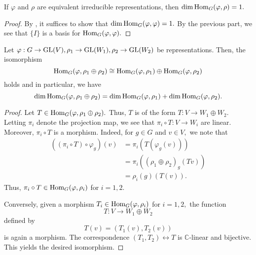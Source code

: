 \begin{cor} \label{cor:schurdimone}
	If $\varphi$ and $\rho$ are equivalent irreducible representations, then $\dim \operatorname{Hom}_{G}(\varphi, \rho) = 1.$
\end{cor}
\begin{proof} 
	By , it suffices to show that $\dim \operatorname{Hom}_{G}(\varphi, \varphi) = 1.$ By the previous part, we see that $\{I\}$ is a basis for $\operatorname{Hom}_{G}(\varphi, \varphi).$
\end{proof}

\begin{prop} \label{prop:homoplusiso}
	Let $\varphi : G \to \operatorname{GL}(V), \rho_1 \to \operatorname{GL}(W_1), \rho_2 \to \operatorname{GL}(W_2)$ be representations. Then, the isomorphism
	\begin{equation*} 
		\operatorname{Hom}_{G}(\varphi, \rho_1 \oplus \rho_2) \cong \operatorname{Hom}_{G}(\varphi, \rho_1) \oplus \operatorname{Hom}_{G}(\varphi, \rho_2)
	\end{equation*}
	holds and in particular, we have
	\begin{equation*} 
		\dim\operatorname{Hom}_{G}(\varphi, \rho_1 \oplus \rho_2) = \dim\operatorname{Hom}_{G}(\varphi, \rho_1) + \dim\operatorname{Hom}_{G}(\varphi, \rho_2).
	\end{equation*}
\end{prop}
\begin{proof} 
	Let $T \in \operatorname{Hom}_{G}(\varphi, \rho_1 \oplus \rho_2).$ Thus, $T$ is of the form $T : V \to W_1 \oplus W_2.$ Letting $\pi_i$ denote the projection map, we see that $\pi_i \circ T : V \to W_i$ are linear.\\
	Moreover, $\pi_i \circ T$ is a morphism. Indeed, for $g \in G$ and $v \in V,$ we note that
	\begin{align*} 
		((\pi_i \circ T)\circ\varphi_g)(v) &= \pi_i(T(\varphi_g(v)))\\
		&= \pi_i\left((\rho_1 \oplus \rho_2)_g(Tv)\right)\\
		&= \rho_i(g)(T(v)).
	\end{align*}
	Thus, $\pi_i \circ T \in \operatorname{Hom}_{G}(\varphi, \rho_i)$ for $i = 1, 2.$ 

	Conversely, given a morphism $T_i \in \operatorname{Hom}_{G}(\varphi, \rho_i)$ for $i = 1, 2,$ the function
	\begin{equation*} 
		T : V \to W_1 \oplus W_2
	\end{equation*}
	defined by
	\begin{equation*} 
		T(v) = (T_1(v), T_2(v))
	\end{equation*}
	is again a morphism. The correspondence $(T_1, T_2) \leftrightarrow T$ is $\mathbb{C}$-linear and bijective. This yields the desired isomorphism.
\end{proof}

